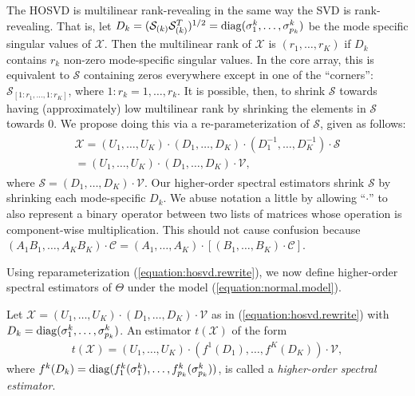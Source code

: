 The HOSVD is multilinear rank-revealing in the same way the SVD is rank-revealing. That is, let $D_k = (\mathcal{S}_{(k)}\mathcal{S}_{(k)}^T)^{1/2} = \operatorname*{diag}(\sigma_1^k,\ldots,\sigma_{p_k}^k)$ be the mode specific singular values of $\mathcal{X}$. Then the multilinear rank of $\mathcal{X}$ is $(r_1,\ldots,r_K)$ if $D_k$ contains $r_k$ non-zero mode-specific singular values. In the core array, this is equivalent to $\mathcal{S}$ containing zeros everywhere except in one of the ``corners'': $\mathcal{S}_{[1:r_1,\ldots,1:r_K]}$, where $1:r_k = 1,\ldots,r_k$. It is possible, then, to shrink $\mathcal{S}$ towards having (approximately) low multilinear rank by shrinking the elements in $\mathcal{S}$ towards $0$. We propose doing this via a re-parameterization of $\mathcal{S}$, given as follows:
\begin{align}
\label{equation:hosvd.rewrite}
  \begin{split}
    \mathcal{X} = (U_1,\ldots,U_K) \cdot (D_1,\ldots,D_K)\cdot (D_1^{-1},\ldots,D_K^{-1})\cdot \mathcal{S}\\
    = (U_1,\ldots,U_K) \cdot (D_1,\ldots,D_K)\cdot \mathcal{V},
  \end{split}
\end{align}
where $\mathcal{S} =  (D_1,\ldots,D_K)\cdot \mathcal{V}$. Our higher-order spectral estimators shrink $\mathcal{S}$ by shrinking each mode-specific $D_k$. We abuse notation a little by allowing ``$\cdot$'' to also represent a binary operator between two lists of matrices whose operation is component-wise multiplication. This should not cause confusion because $(A_1B_1,\ldots,A_KB_K) \cdot \mathcal{C} = (A_1,\ldots,A_K) \cdot [(B_1,\ldots,B_K) \cdot \mathcal{C}]$. 

Using reparameterization (\ref{equation:hosvd.rewrite}), we now define higher-order spectral estimators of $\Theta$ under the model (\ref{equation:normal.model}).
\begin{definition}
  Let $\mathcal{X} = (U_1,\ldots,U_K) \cdot (D_1,\ldots,D_K)\cdot \mathcal{V}$ as in (\ref{equation:hosvd.rewrite}) with $D_k = \operatorname*{diag}(\sigma_1^k,\ldots,\sigma_{p_k}^k)$. An estimator $t(\mathcal{X})$ of the form
  \begin{align}
    \label{equation:ho.spect.est}
    t(\mathcal{X}) = (U_1,\ldots,U_K) \cdot (f^1(D_1),\ldots,f^K(D_K))\cdot \mathcal{V},
  \end{align}
where $f^k(D_k) = \operatorname*{diag}(f_1^k(\sigma_1^k),\ldots,f_{p_k}^k(\sigma_{p_k}^k))$, is called a \emph{higher-order spectral estimator}.
\end{definition}

